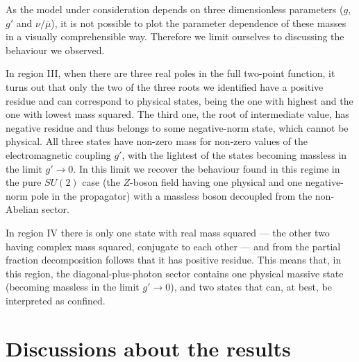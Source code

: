 As the model under consideration depends on three dimensionless parameters ($g$, $g'$ and $\nu/\bar\mu$), it is not possible to plot the parameter dependence of these masses in a visually comprehensible way. Therefore we limit ourselves to discussing the behaviour we observed.

In region III, when there are three real poles in the full two-point function, it turns out that only the two of the three roots we identified have a positive residue and can correspond to physical states, being the one with highest and the one with lowest mass squared. The third one, the root of intermediate value, has negative residue and thus belongs to some negative-norm state, which cannot be physical. All three states have non-zero mass for non-zero values of the electromagnetic coupling $g'$, with the lightest of the states becoming massless in the limit $g'\to0$. In this limit we recover the behaviour found in this regime in the pure $SU(2)$ case \cite{Capri:2012ah} (the $Z$-boson field having one physical and one negative-norm pole in the propagator) with a massless boson decoupled from the non-Abelian sector.

In region IV there is only one state with real mass squared --- the other two having complex mass squared, conjugate to each other --- and from the partial fraction decomposition follows that it has positive residue. This means that, in this region, the diagonal-plus-photon sector contains one physical massive state (becoming massless in the limit $g'\to0$), and two states that can, at best, be interpreted as confined.























\section{Discussions about the results}
\label{discussion}


